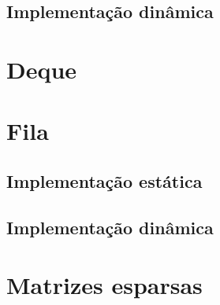 \documentclass[a4paper, twocolumn]{article}
\theoremstyle{definition}
\begin{document}
\subsection{Implementação dinâmica}

\section{Deque}

\section{Fila}

\subsection{Implementação estática}

\subsection{Implementação dinâmica}

\section{Matrizes esparsas}
\end{document}
